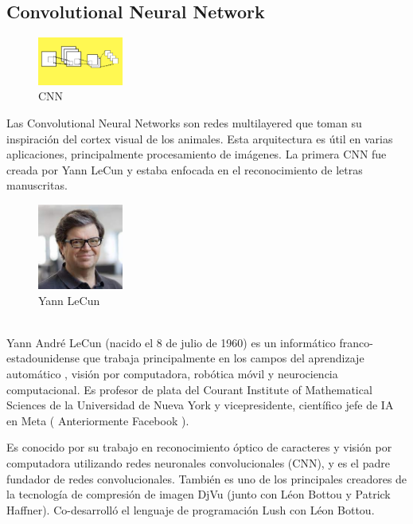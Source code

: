\documentclass[a4paper]{article}
\begin{document}
\subsection{Convolutional Neural Network}
\begin{figure} %
    \centering
    \includegraphics[width=0.25\textwidth]{./images/net_convolutional.png}
    \caption{CNN}
\end{figure}
Las Convolutional Neural Networks son redes multilayered que toman 
su inspiración del cortex visual de los animales. Esta 
arquitectura es útil en varias aplicaciones, principalmente 
procesamiento de imágenes. La primera CNN fue creada por Yann 
LeCun y estaba enfocada en el reconocimiento de letras 
manuscritas.
\begin{figure} %
    \centering
    \includegraphics[width=0.25\textwidth]{./images/Yann_LeCun.jpeg}
    \caption{Yann LeCun}
\end{figure}
\\
Yann André LeCun (nacido el 8 de julio de 1960) es un informático 
franco-estadounidense que trabaja principalmente en los campos del 
aprendizaje automático , visión por computadora, robótica móvil y 
neurociencia computacional. Es profesor de plata del Courant 
Institute of Mathematical Sciences de la Universidad de Nueva York 
y vicepresidente, científico jefe de IA en Meta ( Anteriormente 
Facebook ).

Es conocido por su trabajo en reconocimiento óptico de caracteres 
y visión por computadora utilizando redes neuronales 
convolucionales (CNN), y es el padre fundador de redes 
convolucionales. También es uno de los principales creadores de la 
tecnología de compresión de imagen DjVu (junto con Léon Bottou y 
Patrick Haffner). Co-desarrolló el lenguaje de programación Lush 
con Léon Bottou.
\end{document}

